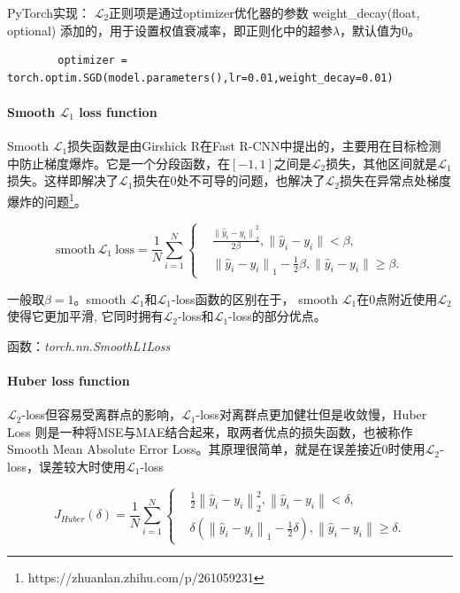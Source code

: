 \documentclass[letterpaper,12pt]{article}
\begin{document}
	PyTorch实现： $\mathcal{L}_2$正则项是通过optimizer优化器的参数 weight\_decay(float, optional) 添加的，用于设置权值衰减率，即正则化中的超参$\lambda$，默认值为0。
	
	\lstset{language=python,breaklines=true}
	\begin{lstlisting}
		optimizer = torch.optim.SGD(model.parameters(),lr=0.01,weight_decay=0.01)
	\end{lstlisting}
	
	\paragraph{Smooth $\mathcal{L}_1$ loss function}
	
	Smooth $\mathcal{L}_1$损失函数是由Girshick R在Fast R-CNN中提出的，主要用在目标检测中防止梯度爆炸。它是一个分段函数，在$\left[-1,1\right]$之间是$\mathcal{L}_2$损失，其他区间就是$\mathcal{L}_1$损失。这样即解决了$\mathcal{L}_1$损失在0处不可导的问题，也解决了$\mathcal{L}_2$损失在异常点处梯度爆炸的问题\footnote{https://zhuanlan.zhihu.com/p/261059231}。
	
	\begin{equation}
		\text{smooth} \ \mathcal{L}_1 \ \text{loss} = \frac{1}{N}\sum_{i=1}^{N}
		\left\{
		\begin{aligned}
			&\frac{{\|\hat{y}_i - y_i \|}_2^{2}}{2\beta}, \| \hat{y}_i -y_i \| < \beta , \\
			&{\|\hat{y}_i - y_i \|}_1 - \frac{1}{2}\beta, \| \hat{y}_i -y_i \| \geq \beta.
		\end{aligned}
		\right.
	\end{equation}		
	
	一般取$\beta=1$。smooth $\mathcal{L}_1$和$\mathcal{L}_1$-loss函数的区别在于， smooth $\mathcal{L}_1$在0点附近使用$\mathcal{L}_2$使得它更加平滑, 它同时拥有$\mathcal{L}_2$-loss和$\mathcal{L}_1$-loss的部分优点。
	
	函数：\textit{torch.nn.SmoothL1Loss}
	
	\paragraph{Huber loss function}
	
	$\mathcal{L}_2$-loss但容易受离群点的影响，$\mathcal{L}_1$-loss对离群点更加健壮但是收敛慢，Huber Loss 则是一种将MSE与MAE结合起来，取两者优点的损失函数，也被称作Smooth Mean Absolute Error Loss。其原理很简单，就是在误差接近0时使用$\mathcal{L}_2$-loss，误差较大时使用$\mathcal{L}_1$-loss
	
	\begin{equation}
		J_{Huber}(\delta)= \frac{1}{N}\sum_{i=1}^{N}
		\left\{
		\begin{aligned}
			&\frac{1}{2}{\left\|\hat{y}_i - y_i \right\|}_2^{2}, \left\| \hat{y}_i -y_i \right\| < \delta , \\
			&\delta\left({\left\|\hat{y}_i - y_i \right\|}_1 - \frac{1}{2}\delta \right), \left\| \hat{y}_i -y_i \right\| \geq \delta.
		\end{aligned}
		\right.
	\end{equation}
	
\end{document}
